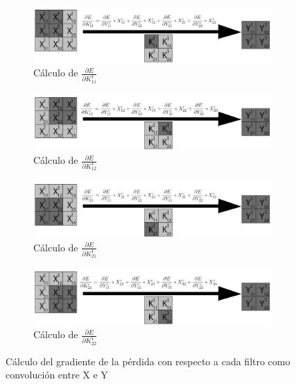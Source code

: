 \begin{figure}[H]
	\centering
	\begin{subfigure}{.5\textwidth}
		\hspace{-25mm}
		\includegraphics[width=1.4\linewidth]{imagenes/conv_backprop_1.jpg}  
		\caption{Cálculo de $\frac{\partial E}{\partial K^1_{11}}$}
	\end{subfigure}%
	\begin{subfigure}{.5\textwidth}
		\hspace{5mm}
		\includegraphics[width=1.4\linewidth]{imagenes/conv_backprop_2.jpg}  
		\caption{Cálculo de $\frac{\partial E}{\partial K^1_{12}}$}
	\end{subfigure}
	\vspace{5mm}
	\begin{subfigure}{.5\textwidth}
	\hspace{-25mm}
	\includegraphics[width=1.4\linewidth]{imagenes/conv_backprop_3.jpg}  
	\caption{Cálculo de $\frac{\partial E}{\partial K^1_{21}}$}
	\end{subfigure}%
	\begin{subfigure}{.5\textwidth}
	\hspace{5mm}
	\includegraphics[width=1.4\linewidth]{imagenes/conv_backprop_4.jpg}  
	\caption{Cálculo de $\frac{\partial E}{\partial K^1_{22}}$}
	\end{subfigure}
	\caption{Cálculo del gradiente de la pérdida con respecto a cada filtro como convolución entre X e Y}
	\label{fig:conv_backprop_como_convolucion_X_Y}
\end{figure}

